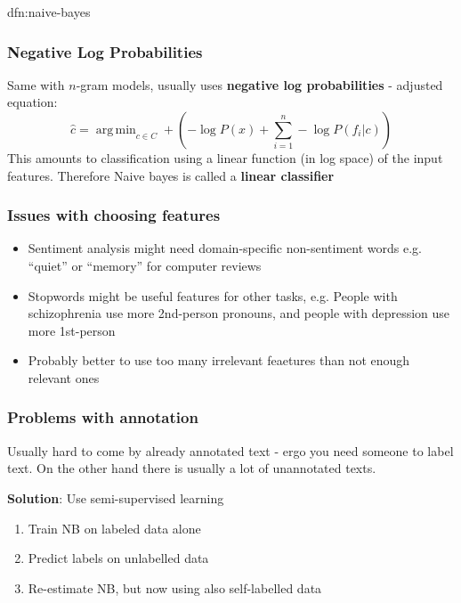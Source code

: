 \documentclass[landscape, 8pt]{extarticle}
\DeclareMathOperator*{\argmin}{arg\,min}
\begin{document}
\begin{multicols}{3}
\begin{dfn}{dfn:naive-bayes}{}
\begin{itemize}[leftmargin=*]
    \end{itemize}
\end{dfn}

\columnbreak

\subsubsection{Negative Log Probabilities}

Same with $n$-gram models, usually uses \textbf{negative log probabilities} - adjusted equation:
\[\hat{c} = \argmin_{c\in C} + (-\log P(x) + \sum_{i = 1}^{n} -\log P(f_{i} | c))\]
This amounts to classification using a linear function (in log space) of the input features. Therefore Naive bayes is called a \textbf{linear classifier}

\subsubsection{Issues with choosing features}
\begin{itemize}
    \setlength\itemsep{0em}
    \item Sentiment analysis might need domain-specific non-sentiment words e.g. ``quiet'' or ``memory'' for computer reviews
    \item Stopwords might be useful features for other tasks, e.g. People with schizophrenia use more 2nd-person pronouns, and people with depression use more 1st-person
    \item Probably better to use too many irrelevant feaetures than not enough relevant ones
\end{itemize}

\subsubsection{Problems with annotation}
Usually hard to come by already annotated text - ergo you need someone to label text. On the other hand there is usually a lot of unannotated texts.

\textbf{Solution}: Use semi-supervised learning
\begin{enumerate}
    \setlength\itemsep{0em}
    \item Train NB on labeled data alone
    \item Predict labels on unlabelled data
    \item Re-estimate NB, but now using also self-labelled data
\end{enumerate}


\end{multicols}
\end{document}
